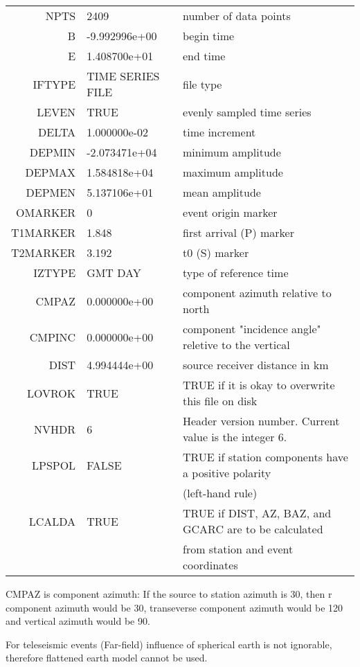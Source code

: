 \documentclass[11pt,titlepage,fleqn]{article}
\begin{document}
\begin{enumerate}
\begin{tabular}{rll}
    NPTS & 2409		        & number of data points\\
       B & -9.992996e+00	& begin time\\
       E & 1.408700e+01		& end time\\
  IFTYPE & TIME SERIES FILE	& file type\\
   LEVEN & TRUE			& evenly sampled time series \\
   DELTA & 1.000000e-02		& time increment \\
  DEPMIN & -2.073471e+04	& minimum amplitude\\
  DEPMAX & 1.584818e+04		& maximum amplitude\\
  DEPMEN & 5.137106e+01		& mean amplitude\\
 OMARKER & 0			& event origin marker\\
T1MARKER & 1.848		& first arrival (P) marker\\
T2MARKER & 3.192		& t0 (S) marker\\
  IZTYPE & GMT DAY		& type of reference time\\
   CMPAZ & 0.000000e+00		& component azimuth relative to north\\
  CMPINC & 0.000000e+00		& component "incidence angle" reletive to the vertical\\
    DIST & 4.994444e+00		& source receiver distance in km\\
  LOVROK & TRUE			& TRUE if it is okay to overwrite this file on disk\\
   NVHDR & 6			& Header version number. Current value is the integer 6.\\
  LPSPOL & FALSE		& TRUE if station components have a positive polarity \\
         &                      & (left-hand rule)\\
  LCALDA & TRUE			& TRUE if DIST, AZ, BAZ, and GCARC are to be calculated \\
         &                      & from station and event coordinates
\end{tabular}
CMPAZ is component azimuth: If the source to station azimuth is 30, then r component azimuth would be 30, transeverse component azimuth would be 120 and vertical azimuth would be 90.

For teleseismic events (Far-field) influence of spherical earth is not ignorable, therefore flattened earth model cannot be used.

\end{enumerate}
\end{document}
